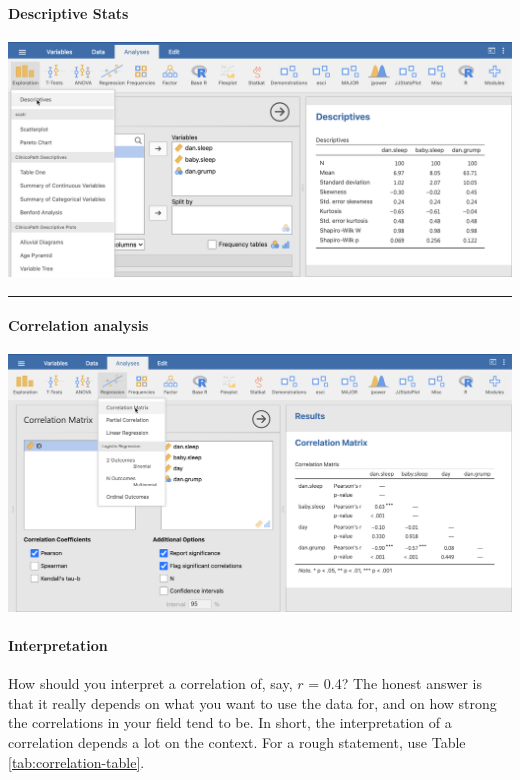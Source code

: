 \documentclass[
]{article}
\begin{document}
\hypertarget{descriptive-stats}{%
\paragraph*{Descriptive Stats}\label{descriptive-stats}}

\includegraphics{images/paste-3DBA2127.png}

\begin{center}\rule{0.5\linewidth}{0.5pt}\end{center}

\hypertarget{correlation-analysis}{%
\paragraph*{Correlation analysis}\label{correlation-analysis}}

\includegraphics{images/paste-34DE3154.png}

\hypertarget{interpretation}{%
\paragraph{Interpretation}\label{interpretation}}

How should you interpret a correlation of, say, \(r\) = 0.4? The honest answer is that it really depends on what you want to use the data for, and on how strong the correlations in your field tend to be. In short, the interpretation of a correlation depends a lot on the context. For a rough statement, use Table \ref{tab:correlation-table}.
\end{document}
